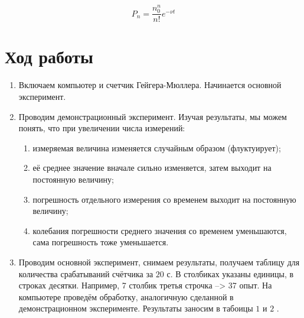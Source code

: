 \documentclass[a4paper, 12pt]{article}
\begin{document}
	\begin{equation}
		P_n = \frac{n_0^n}{n!}e^{-\nu t}
	\end{equation}
	
	\section{Ход работы}
	
	\begin{enumerate}
		\item Включаем компьютер и счетчик Гейгера-Мюллера. Начинается основной эксперимент.
		\item Проводим демонстрационный эксперимент. Изучая результаты, мы можем понять, что при увеличении числа измерений:
		\begin{enumerate}
			\item измеряемая величина изменяется случайным образом (флуктуирует);
			\item её среднее значение вначале сильно изменяется, затем выходит на постоянную величину;
			\item погрешность отдельного измерения со временем выходит на постоянную величину;
			\item колебания погрешности среднего значения со временем уменьшаются, сама погрешность тоже уменьшается.
		\end{enumerate}
		\item Проводим основной эксперимент, снимаем результаты, получаем таблицу для количества срабатываний счётчика за $20$ с. В столбиках указаны единицы, в строках десятки. Например, 7 столбик третья строчка --> 37 опыт. На компьютере проведём обработку, аналогичную сделанной в демонстрационном эксперименте. Результаты заносим в табоицы $1$ и $2$ .
		

\end{enumerate}
\end{document}
